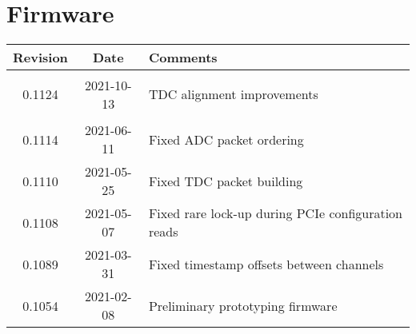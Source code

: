 \section{Firmware}
\begin{tabularx}{\textwidth}{|c|c|X|}
    \hline
    Revision & Date & Comments\\
    \hline\hline
	\hypertarget{fwrev}{0.1124} & 2021-10-13 & TDC alignment improvements\\
	\hline
	0.1114 & 2021-06-11 & Fixed ADC packet ordering\\
	\hline
	0.1110 & 2021-05-25 & Fixed TDC packet building\\
	\hline
	0.1108 & 2021-05-07 & Fixed rare lock-up during PCIe configuration reads\\
	\hline
	0.1089 & 2021-03-31 & Fixed timestamp offsets between channels\\
	\hline
    0.1054 & 2021-02-08 & Preliminary prototyping firmware\\
    \hline
\end{tabularx}